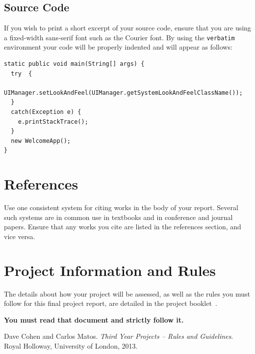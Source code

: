 \documentclass[]{final_report}
\begin{document}
\section{Source Code}

If you wish to print a short excerpt of your source code,  ensure that you are using a fixed-width sans-serif font such as the Courier font. By using the \verb|verbatim| environment your code will be properly indented and will appear as follows:

\begin{verbatim}
static public void main(String[] args) {
  try  {
    UIManager.setLookAndFeel(UIManager.getSystemLookAndFeelClassName());
  }
  catch(Exception e) {
    e.printStackTrace();
  }
  new WelcomeApp();
} 
\end{verbatim}

\chapter{References}

Use one consistent system for citing works in the body of your report. Several such systems are in common use in textbooks and in conference and journal papers. Ensure that any works you cite are listed in the references section, and vice versa. 

\chapter{Project Information and Rules}

The details about how your project will be assessed, as well as the rules you must follow for this final project report, are detailed in the project booklet~\cite{COHEN:2013}.

\textbf{You must read that document and strictly follow it.}


\newpage
\begin{thebibliography}{99}
 Dave Cohen and Carlos Matos. \emph{Third Year Projects -- Rules and Guidelines}. Royal Holloway, University of London, 2013.
\end{thebibliography}
\label{endpage}
\end{document}
